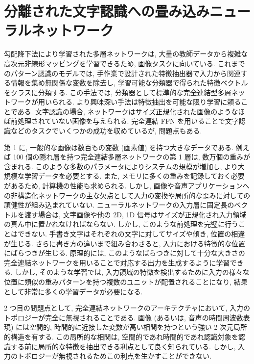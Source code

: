\documentclass[twocolumn]{jarticle}     %
\begin{document}
\section{分離された文字認識への畳み込みニューラルネットワーク}
勾配降下法により学習された多層ネットワークは, 大量の教師データから複雑な高次元非線形マッピングを学習できるため, 画像タスクに向いている.
これまでのパターン認識のモデルでは, 手作業で設計された特徴抽出器で入力から関連する情報を集め無関係な変数を除去し, 学習可能な分類器で得られた特徴ベクトルをクラスに分類する. 
この手法では, 分類器として標準的な完全連結型多層ネットワークが用いられる. 
より興味深い手法は特徴抽出を可能な限り学習に頼ることである. 文字認識の場合, ネットワークはサイズ正規化された画像のようなほぼ前処理されていない画像を与えられる. 完全連結 FFN を用いることで文字認識などのタスクでいくつかの成功を収めているが, 問題点もある.
\par
第 1 に, 一般的な画像は数百もの変数 (画素値) を持つ大きなデータである. 例えば 100 個の隠れ層を持つ完全連結多層ネットワークの第 1 層は, 数万個の重みが含まれる. このような多数のパラメータによりシステムの規模が増加し, より大規模な学習データを必要とする. 
また, メモリに多くの重みを記録しておく必要があるため, 計算機の性能も求められる. しかし, 画像や音声アプリケーションへの非構造化ネットワークの主な欠点として入力の変換や局所的な歪みに対しての頑健性が組み込まれていない.
ニューラルネットワークの入力層に固定長のベクトルを渡す場合は, 文字画像や他の 2D, 1D 信号はサイズが正規化され入力領域の真ん中に置かれなければならない.
しかし, このような前処理を完璧に行うことはできない. 手書き文字はそれぞれの文字に対してサイズや傾き, 位置の相違が生じる. さらに書き方の違いまで組み合わさると, 入力における特徴的な位置にばらつきが生じる. 
原理的には, このようなばらつきに対して十分な大きさの完全連結ネットワークを用いることで対応する出力を生成するように学習できる. しかし, そのような学習では, 入力領域の特徴を検出するために入力の様々な位置に類似の重みパターンを持つ複数のユニットが配置されることになり, 結果として非常に多くの学習データが必要になる. 
\par
2 つ目の問題点として, 完全連結ネットワークのアーキテクチャにおいて, 入力のトポロジーが完全に無視されることである. 画像 (あるいは, 音声の時間周波数表現) には空間的, 時間的に近接した変数が高い相関を持つという強い 2 次元局所的構造を有する. この局所的な相関は, 空間的であれ時間的であれ認識対象を認識する前に局所的な特徴を抽出できる利点として良く知られている. しかし, 入力のトポロジーが無視されるためこの利点を生かすことができない. 
\end{document}
